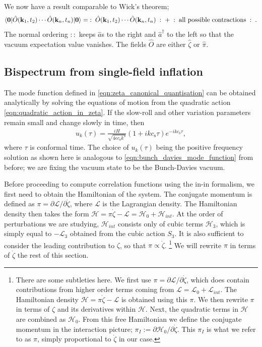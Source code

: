 We now have a result comparable to Wick's theorem;
\begin{align}
	\langle\mathbf{0}| \hat{O}(\mathbf{k}_1,t_2) \cdots \hat{O}(\mathbf{k}_n,t_n) |\mathbf{0}\rangle = \;:\; \hat{O}(\mathbf{k}_1,t_2)  \cdots \hat{O}(\mathbf{k}_n,t_n) \;:\; + \;:\;\text{all possible contractions}\;:\;. \label{eqn:in_in_Wicks_theorem}
\end{align}
The normal ordering $::$ keeps $\hat{a}$s to the right and $\hat{a}^\dagger$ to the left so that the vacuum expectation value vanishes. The fields $\hat{O}$ are either $\hat{\zeta}$ or $\hat{\pi}$. 

\subsection{Bispectrum from single-field inflation} \label{section:bispectrum_from_single_field_inflation}

The mode function defined in \eqref{eqn:zeta_canonical_quantisation} can be obtained analytically by solving the equations of motion from the quadratic action \eqref{eqn:quadratic_action_in_zeta}. If the slow-roll and other variation parameters remain small and change slowly in time, then
\begin{align}
	u_k(\tau) = \frac{iH}{\sqrt{4\epsilon c_\text{s} k^3}} (1 + ikc_\text{s} \tau) e^{-ikc_\text{s} \tau},
\end{align}
where $\tau$ is conformal time. The choice of $u_k(\tau)$ being the positive frequency solution as shown here is analogous to \eqref{eqn:bunch_davies_mode_function} from before; we are fixing the vacuum state to be the Bunch-Davies vacuum.

Before proceeding to compute correlation functions using the in-in formalism, we first need to obtain the Hamiltonian of the system. The conjugate momentum is defined as $\pi = \partial \mathcal{L} / \partial \dot{\zeta}$, where $\mathcal{L}$ is the Lagrangian density. The Hamiltonian density then takes the form $\mathcal{H} = \pi \dot{\zeta} - \mathcal{L} = \mathcal{H}_0 + \mathcal{H}_{int}$. At the order of perturbations we are studying, $\mathcal{H}_{int}$ consists only of cubic terms $\mathcal{H}_3$, which is simply equal to $-\mathcal{L}_3$ obtained from the cubic action $S_3$. It is also sufficient to consider the leading contribution to $\zeta$, so that $\pi \propto \dot{\zeta}$.
\footnote{There are some subtleties here. We first use $\pi = \partial \mathcal{L} / \partial \dot{\zeta}$, which does contain contributions from higher order terms coming from $\mathcal{L}=\mathcal{L}_0 + \mathcal{L}_{int}$. The Hamiltonian density $\mathcal{H} = \pi \dot{\zeta} - \mathcal{L}$ is obtained using this $\pi$. We then rewrite $\pi$ in terms of $\zeta$ and its derivatives within $\mathcal{H}$. Next, the quadratic terms in $\mathcal{H}$ are combined as $\mathcal{H}_0$. From this free Hamiltonian we define the conjugate momentum in the interaction picture; $\pi_I :=  \partial \mathcal{H}_0 / \partial \dot{\zeta}$. This $\pi_I$ is what we refer to as $\pi$, simply proportional to $\dot{\zeta}$ in our case.}
We will rewrite $\pi$ in terms of $\dot{\zeta}$ the rest of this section.

